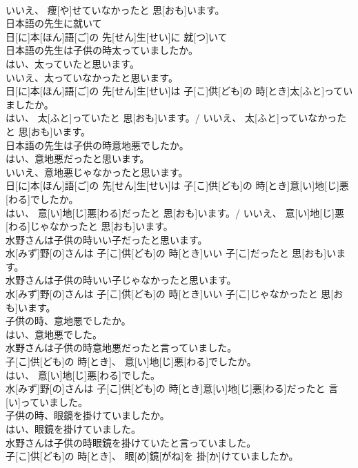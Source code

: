 \documentclass[8pt]{extreport}
\begin{document}
\begin{CJK}{UTF8}{min}
\\	いいえ、 痩[や]せていなかったと 思[おも]います。
\\	日本語の先生に就いて	
\\	日[に]本[ほん]語[ご]の 先[せん]生[せい]に 就[つ]いて
\\	日本語の先生は子供の時太っていましたか。 
\\	はい、太っていたと思います。 
\\	いいえ、太っていなかったと思います。	
\\	日[に]本[ほん]語[ご]の 先[せん]生[せい]は 子[こ]供[ども]の 時[とき]太[ふと]っていましたか。 
\\	はい、 太[ふと]っていたと 思[おも]います。/ いいえ、 太[ふと]っていなかったと 思[おも]います。
\\	日本語の先生は子供の時意地悪でしたか。 
\\	はい、意地悪だったと思います。 
\\	いいえ、意地悪じゃなかったと思います。	
\\	日[に]本[ほん]語[ご]の 先[せん]生[せい]は 子[こ]供[ども]の 時[とき]意[い]地[じ]悪[わる]でしたか。 
\\	はい、 意[い]地[じ]悪[わる]だったと 思[おも]います。/ いいえ、 意[い]地[じ]悪[わる]じゃなかったと 思[おも]います。
\\	水野さんは子供の時いい子だったと思います。	
\\	水[みず]野[の]さんは 子[こ]供[ども]の 時[とき]いい 子[こ]だったと 思[おも]います。
\\	水野さんは子供の時いい子じゃなかったと思います。	
\\	水[みず]野[の]さんは 子[こ]供[ども]の 時[とき]いい 子[こ]じゃなかったと 思[おも]います。
\\	子供の時、意地悪でしたか。 
\\	はい、意地悪でした。 
\\	水野さんは子供の時意地悪だったと言っていました。	
\\	子[こ]供[ども]の 時[とき]、 意[い]地[じ]悪[わる]でしたか。 
\\	はい、 意[い]地[じ]悪[わる]でした。 
\\	水[みず]野[の]さんは 子[こ]供[ども]の 時[とき]意[い]地[じ]悪[わる]だったと 言[い]っていました。
\\	子供の時、眼鏡を掛けていましたか。 
\\	はい、眼鏡を掛けていました。 
\\	水野さんは子供の時眼鏡を掛けていたと言っていました。	
\\	子[こ]供[ども]の 時[とき]、 眼[め]鏡[がね]を 掛[か]けていましたか。 

\end{CJK}
\end{document}
